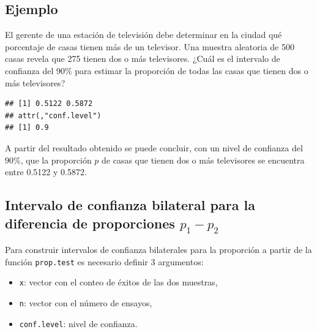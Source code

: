\documentclass[10pt,]{krantz}
\makeatletter
\newenvironment{Shaded}{\begin{snugshade}}{\end{snugshade}}
\newcommand{\KeywordTok}[1]{\textcolor[rgb]{0.13,0.29,0.53}{\textbf{#1}}}
\newcommand{\DataTypeTok}[1]{\textcolor[rgb]{0.13,0.29,0.53}{#1}}
\newcommand{\DecValTok}[1]{\textcolor[rgb]{0.00,0.00,0.81}{#1}}
\newcommand{\FloatTok}[1]{\textcolor[rgb]{0.00,0.00,0.81}{#1}}
\newcommand{\OperatorTok}[1]{\textcolor[rgb]{0.81,0.36,0.00}{\textbf{#1}}}
\newcommand{\NormalTok}[1]{#1}
\providecommand{\tightlist}{%
  \setlength{\itemsep}{0pt}\setlength{\parskip}{0pt}}
\newenvironment{kframe}{%
\medskip{}
\setlength{\fboxsep}{.8em}
 \def\at@end@of@kframe{}%
 \ifinner\ifhmode%
  \def\at@end@of@kframe{\end{minipage}}%
  \begin{minipage}{\columnwidth}%
 \fi\fi%
 \def\FrameCommand##1{\hskip\@totalleftmargin \hskip-\fboxsep
 \colorbox{shadecolor}{##1}\hskip-\fboxsep
     \hskip-\linewidth \hskip-\@totalleftmargin \hskip\columnwidth}%
 \MakeFramed {\advance\hsize-\width
   \@totalleftmargin\z@ \linewidth\hsize
   \@setminipage}}%
 {\par\unskip\endMakeFramed%
 \at@end@of@kframe}
\renewenvironment{Shaded}{\begin{kframe}}{\end{kframe}}
\makeatother
\begin{document}
\subsection*{Ejemplo}\label{ejemplo-61}


El gerente de una estación de televisión debe determinar en la ciudad
qué porcentaje de casas tienen más de un televisor. Una muestra
aleatoria de 500 casas revela que 275 tienen dos o más televisores.
¿Cuál es el intervalo de confianza del 90\% para estimar la proporción
de todas las casas que tienen dos o más televisores?

\begin{Shaded}
\end{Shaded}

\begin{verbatim}
## [1] 0.5122 0.5872
## attr(,"conf.level")
## [1] 0.9
\end{verbatim}

A partir del resultado obtenido se puede concluir, con un nivel de
confianza del \(90\%\), que la proporción \(p\) de casas que tienen dos
o más televisores se encuentra entre 0.5122 y 0.5872.

\subsection{\texorpdfstring{Intervalo de confianza bilateral para la
diferencia de proporciones
\(p_1 - p_2\)}{Intervalo de confianza bilateral para la diferencia de proporciones p\_1 - p\_2}}\label{intervalo-de-confianza-bilateral-para-la-diferencia-de-proporciones-p_1---p_2}

Para construir intervalos de confianza bilaterales para la proporción a
partir de la función \texttt{prop.test} es necesario definir 3
argumentos:

\begin{itemize}
\tightlist
\item
  \texttt{x}: vector con el conteo de éxitos de las dos muestras,
\item
  \texttt{n}: vector con el número de ensayos,
\item
  \texttt{conf.level}: nivel de confianza.
\end{itemize}
\end{document}

